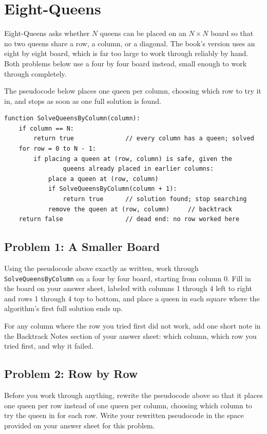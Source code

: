 \documentclass[11pt]{article}
\begin{document}
\section{Eight-Queens}

Eight-Queens asks whether $N$ queens can be placed on an $N \times N$ board
so that no two queens share a row, a column, or a diagonal. The book's
version uses an eight by eight board, which is far too large to work through
reliably by hand. Both problems below use a four by four board instead,
small enough to work through completely.

The pseudocode below places one queen per column, choosing which row to try
it in, and stops as soon as one full solution is found.

\begin{lstlisting}
function SolveQueensByColumn(column):
    if column == N:
        return true              // every column has a queen; solved
    for row = 0 to N - 1:
        if placing a queen at (row, column) is safe, given the
                queens already placed in earlier columns:
            place a queen at (row, column)
            if SolveQueensByColumn(column + 1):
                return true      // solution found; stop searching
            remove the queen at (row, column)     // backtrack
    return false                 // dead end: no row worked here
\end{lstlisting}

\subsection{Problem 1: A Smaller Board}
Using the pseudocode above exactly as written, work through
\texttt{SolveQueensByColumn} on a four by four board, starting from column
0. Fill in the board on your answer sheet, labeled with columns 1 through 4
left to right and rows 1 through 4 top to bottom, and place a queen in each
square where the algorithm's first full solution ends up.

For any column where the row you tried first did not work, add one short
note in the Backtrack Notes section of your answer sheet: which column,
which row you tried first, and why it failed.

\subsection{Problem 2: Row by Row}
Before you work through anything, rewrite the pseudocode above so that it
places one queen per row instead of one queen per column, choosing which
column to try the queen in for each row. Write your rewritten pseudocode in
the space provided on your answer sheet for this problem.
\end{document}
